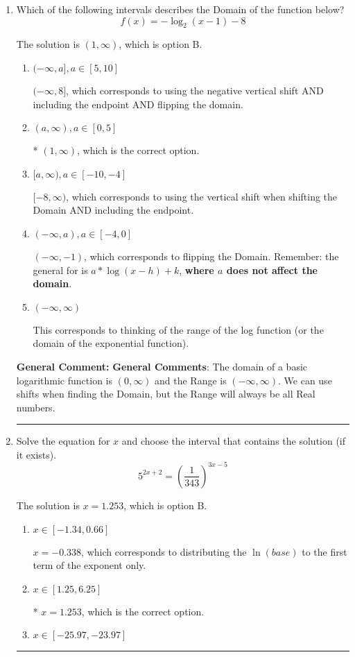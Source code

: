 \documentclass{extbook}[14pt]
\newcommand{\litem}[1]{\item #1

\rule{\textwidth}{0.4pt}}
\begin{document}
\begin{enumerate}\litem{
Which of the following intervals describes the Domain of the function below?
\[ f(x) = -\log_2{(x-1)}-8 \]

The solution is \( (1, \infty) \), which is option B.\begin{enumerate}[label=\Alph*.]
\item \( (-\infty, a], a \in [5, 10] \)

$(-\infty, 8]$, which corresponds to using the negative vertical shift AND including the endpoint AND flipping the domain.
\item \( (a, \infty), a \in [0, 5] \)

* $(1, \infty)$, which is the correct option.
\item \( [a, \infty), a \in [-10, -4] \)

$[-8, \infty)$, which corresponds to using the vertical shift when shifting the Domain AND including the endpoint.
\item \( (-\infty, a), a \in [-4, 0] \)

$(-\infty, -1)$, which corresponds to flipping the Domain. Remember: the general for is $a*\log(x-h)+k$, \textbf{where $a$ does not affect the domain}.
\item \( (-\infty, \infty) \)

This corresponds to thinking of the range of the log function (or the domain of the exponential function).
\end{enumerate}

\textbf{General Comment:} \textbf{General Comments}: The domain of a basic logarithmic function is $(0, \infty)$ and the Range is $(-\infty, \infty)$. We can use shifts when finding the Domain, but the Range will always be all Real numbers.
}
\litem{
Solve the equation for $x$ and choose the interval that contains the solution (if it exists).
\[ 5^{2x+2} = \left(\frac{1}{343}\right)^{3x-5} \]

The solution is \( x = 1.253 \), which is option B.\begin{enumerate}[label=\Alph*.]
\item \( x \in [-1.34, 0.66] \)

$x = -0.338$, which corresponds to distributing the $\ln(base)$ to the first term of the exponent only.
\item \( x \in [1.25, 6.25] \)

* $x = 1.253$, which is the correct option.
\item \( x \in [-25.97, -23.97] \)


\end{enumerate}}
\end{enumerate}
\end{document}
